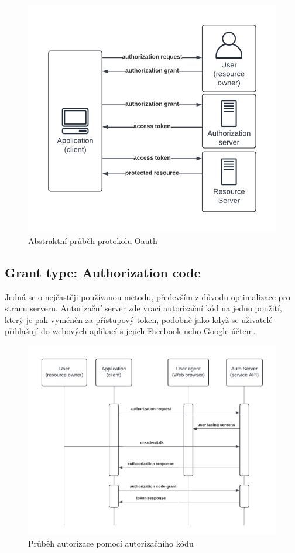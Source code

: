 \begin{figure}[ht!]
    \centering
    \includegraphics[width=\textwidth]{figures/OAuth_abstract_flow.pdf}
    \caption{Abstraktní průběh protokolu Oauth \cite{oauthRoles} }
    \label{fig:Oauth_roles_diagram}
\end{figure}


\subsection{Grant type: Authorization code}
Jedná se o nejčastěji používanou metodu, především z důvodu optimalizace pro stranu serveru. Autorizační server zde vrací autorizační kód na jedno použití, který je pak vyměněn za přístupový token, podobně jako když se uživatelé přihlašují do webových aplikací s jejich Facebook nebo Google účtem.

\begin{figure}[ht!]
    \centering
    \includegraphics[width=\textwidth]{figures/Oauth auth flow.pdf}
    \caption[short]{Průběh autorizace pomocí autorizačního kódu}%
    \label{fig:Oauth_auth_flow}
\end{figure}


